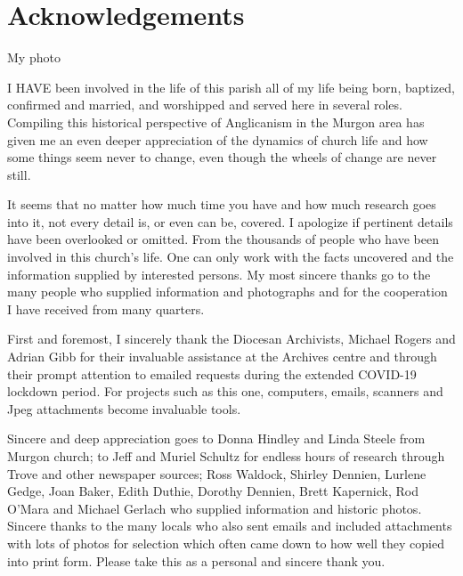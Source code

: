 \balance


\printendnotes[custom]
\setcounter{endnote}{0}
\chapter{Acknowledgements}
\nobalance


My photo



\lettrine[lines=3]{I}{ HAVE}
 been involved in the life of this parish all of my life being born, baptized, confirmed and married, and worshipped and served here in several roles. Compiling this historical perspective of Anglicanism in the Murgon area has given me an even deeper appreciation of the dynamics of church life and how some things seem never to change, even though the wheels of change are never still.

It seems that no matter how much time you have and how much research goes into it, not every detail is, or even can be, covered. I apologize if pertinent details have been overlooked or omitted. From the thousands of people who have been involved in this church's life. One can only work with the facts uncovered and the information supplied by interested persons. My most sincere thanks go to the many people who supplied information and photographs and for the cooperation I have received from many quarters.



First and foremost, I sincerely thank the Diocesan Archivists, Michael Rogers and Adrian Gibb for their invaluable assistance at the Archives centre and through their prompt attention to emailed requests during the extended COVID-19 lockdown period. For projects such as this one, computers, emails, scanners and Jpeg attachments become invaluable tools.



Sincere and deep appreciation goes to Donna Hindley and Linda Steele from Murgon church; to Jeff and Muriel Schultz for endless hours of research through Trove and other newspaper sources; Ross Waldock, Shirley Dennien, Lurlene Gedge, Joan Baker, Edith Duthie, Dorothy Dennien, Brett Kapernick, Rod O'Mara and Michael Gerlach who supplied information and historic photos. Sincere thanks to the many locals who also sent emails and included attachments with lots of photos for selection which often came down to how well they copied into print form. Please take this as a personal and sincere thank you.



